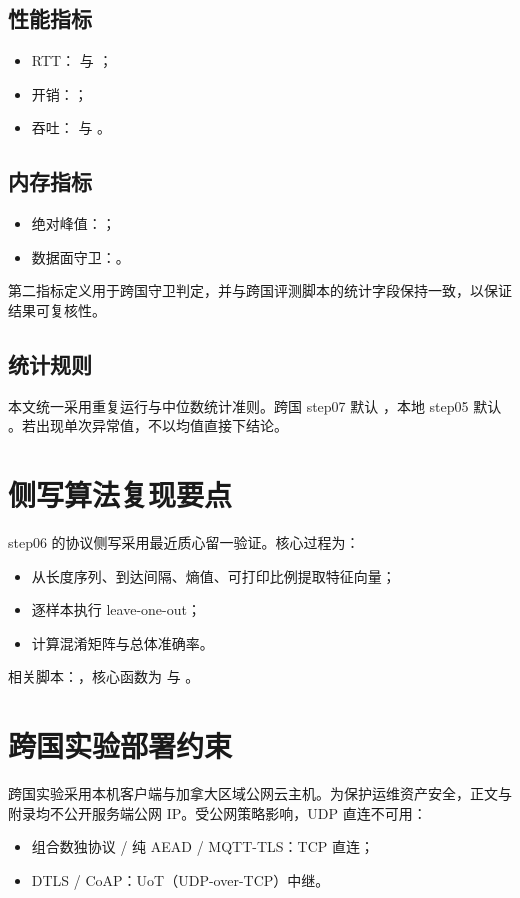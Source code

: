 \subsection{性能指标}
\begin{itemize}
  \item RTT： 与 ；
  \item 开销：；
  \item 吞吐： 与 。
\end{itemize}

\subsection{内存指标}
\begin{itemize}
  \item 绝对峰值：；
  \item 数据面守卫：。
\end{itemize}

第二指标定义用于跨国守卫判定，并与跨国评测脚本的统计字段保持一致，以保证结果可复核性。

\subsection{统计规则}
本文统一采用重复运行与中位数统计准则。跨国 step07 默认 ，本地 step05 默认 。若出现单次异常值，不以均值直接下结论。

\section{侧写算法复现要点}
step06 的协议侧写采用最近质心留一验证。核心过程为：
\begin{itemize}
  \item 从长度序列、到达间隔、熵值、可打印比例提取特征向量；
  \item 逐样本执行 leave-one-out；
  \item 计算混淆矩阵与总体准确率。
\end{itemize}

相关脚本：，核心函数为  与 。

\section{跨国实验部署约束}
跨国实验采用本机客户端与加拿大区域公网云主机。为保护运维资产安全，正文与附录均不公开服务端公网 IP。受公网策略影响，UDP 直连不可用：
\begin{itemize}
  \item 组合数独协议 / 纯 AEAD / MQTT-TLS：TCP 直连；
  \item DTLS / CoAP：UoT（UDP-over-TCP）中继。
\end{itemize}

